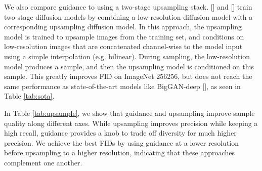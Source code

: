 \documentclass{article}
\newcommand{\shortcite}[1]{[\citenum{#1}]}
\newcommand{\namecite}[1]{\citeauthor{#1} [\citenum{#1}]}
\begin{document}
We also compare guidance to using a two-stage upsampling stack. \namecite{improved} and \namecite{sr3} train two-stage diffusion models by combining a low-resolution diffusion model with a corresponding upsampling diffusion model. In this approach, the upsampling model is trained to upsample images from the training set, and conditions on low-resolution images that are concatenated channel-wise to the model input using a simple interpolation (e.g. bilinear). During sampling, the low-resolution model produces a sample, and then the upsampling model is conditioned on this sample. This greatly improves FID on ImageNet 256256, but does not reach the same performance as state-of-the-art models like BigGAN-deep \shortcite{improved,sr3}, as seen in Table \ref{tab:sota}. 

In Table \ref{tab:upsample}, we show that guidance and upsampling improve sample quality along different axes. While upsampling improves precision while keeping a high recall, guidance provides a knob to trade off diversity for much higher precision. We achieve the best FIDs by using guidance at a lower resolution before upsampling to a higher resolution, indicating that these approaches complement one another.
\end{document}
